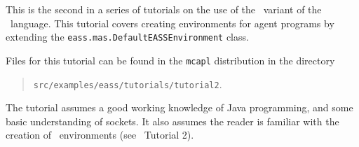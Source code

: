 
This is the second in a series of tutorials on the use of the \eass\ variant of the \gwendolen\ language.  This tutorial covers creating environments for agent programs by extending the \texttt{eass.mas.DefaultEASSEnvironment} class.  

Files for this tutorial can be found in the \texttt{mcapl} distribution in the directory 
\begin{quote}
\texttt{src/examples/eass/tutorials/tutorial2}.
\end{quote}

The tutorial assumes a good working knowledge of Java programming, and some basic understanding of sockets.  It also assumes the reader is familiar with the creation of \ail\ environments (see \ail\ Tutorial 2).

